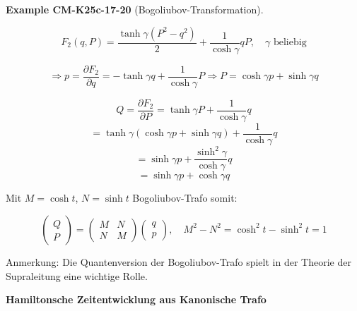 \documentclass[10pt, letterpaper]{article}
\newcommand{\CustomHeading}[3]{%
  \par\medskip\noindent%
  \textbf{#1 #2} \textnormal{(#3)}.\enskip%
}
\newenvironment{EXA}[2]{\begin{unitbox}\CustomHeading{Example}{#1}{#2}}{\end{unitbox}}
\begin{document}
\begin{EXA}{CM-K25c-17-20}{Bogoliubov-Transformation}
\[F_2(q,P) = \frac{\tanh\gamma(P^2-q^2)}{2} + \frac{1}{\cosh\gamma}qP, \quad \gamma \text{ beliebig}\]

\[\Rightarrow p = \frac{\partial F_2}{\partial q} = -\tanh\gamma q + \frac{1}{\cosh\gamma}P \Rightarrow P = \cosh\gamma p + \sinh\gamma q\]

\[Q = \frac{\partial F_2}{\partial P} = \tanh\gamma P + \frac{1}{\cosh\gamma}q\]
\[= \tanh\gamma(\cosh\gamma p + \sinh\gamma q) + \frac{1}{\cosh\gamma}q\]
\[= \sinh\gamma p + \frac{\sinh^2\gamma}{\cosh\gamma}q\]
\[= \sinh\gamma p + \cosh\gamma q\]

Mit $M = \cosh t$, $N = \sinh t$ Bogoliubov-Trafo somit:

\[
\begin{pmatrix} Q \\ P \end{pmatrix} = 
\begin{pmatrix} M & N \\ N & M \end{pmatrix}
\begin{pmatrix} q \\ p \end{pmatrix}, \quad M^2 - N^2 = \cosh^2 t - \sinh^2 t = 1
\]
\end{EXA}

Anmerkung: Die Quantenversion der Bogoliubov-Trafo spielt in der Theorie der Supraleitung eine wichtige Rolle.




\textbf{Hamiltonsche Zeitentwicklung aus Kanonische Trafo}
\end{document}
